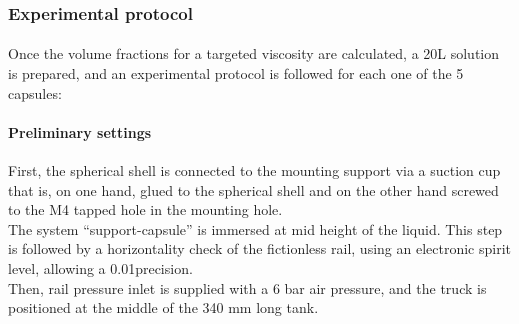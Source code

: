 \subsubsection{Experimental protocol}
\paragraph{}
Once the volume fractions for a targeted viscosity are calculated, a 20L solution is prepared, and an experimental protocol is followed for each one of the 5 capsules:
\paragraph{Preliminary settings}
First, the spherical shell is connected to the mounting support via a suction cup that is, on one hand, glued to the spherical shell and on the other hand screwed to the M4 tapped hole in the mounting hole.\\
The system "`support-capsule"' is immersed at mid height of the liquid. This step is followed by a horizontality check of the fictionless rail, using an electronic spirit level, allowing a 0.01\textdegree precision.\\
Then, rail pressure inlet is supplied with a 6 bar air pressure, and the truck is positioned at the middle of the 340 mm long tank.\\
